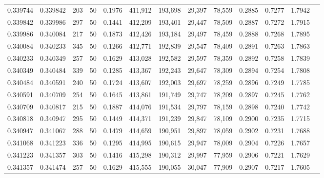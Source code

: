 \begin{tabular}{rrrrrrrrrrrrr}
0.339744 & 0.339842 &   203 &  50 &                                     0.1976 & 411,912 & 193,698 &  29,397 &  78,559 & 0.2885 & 0.7277 & 1.7942 \\
0.339842 & 0.339986 &   297 &  50 &                                     0.1441 & 412,209 & 193,401 &  29,447 &  78,509 & 0.2887 & 0.7272 & 1.7915 \\
0.339986 & 0.340084 &   217 &  50 &                                     0.1873 & 412,426 & 193,184 &  29,497 &  78,459 & 0.2888 & 0.7268 & 1.7895 \\
0.340084 & 0.340233 &   345 &  50 &                                     0.1266 & 412,771 & 192,839 &  29,547 &  78,409 & 0.2891 & 0.7263 & 1.7863 \\
0.340233 & 0.340349 &   257 &  50 &                                     0.1629 & 413,028 & 192,582 &  29,597 &  78,359 & 0.2892 & 0.7258 & 1.7839 \\
0.340349 & 0.340484 &   339 &  50 &                                     0.1285 & 413,367 & 192,243 &  29,647 &  78,309 & 0.2894 & 0.7254 & 1.7808 \\
0.340484 & 0.340591 &   240 &  50 &                                     0.1724 & 413,607 & 192,003 &  29,697 &  78,259 & 0.2896 & 0.7249 & 1.7785 \\
0.340591 & 0.340709 &   254 &  50 &                                     0.1645 & 413,861 & 191,749 &  29,747 &  78,209 & 0.2897 & 0.7245 & 1.7762 \\
0.340709 & 0.340817 &   215 &  50 &                                     0.1887 & 414,076 & 191,534 &  29,797 &  78,159 & 0.2898 & 0.7240 & 1.7742 \\
0.340818 & 0.340947 &   295 &  50 &                                     0.1449 & 414,371 & 191,239 &  29,847 &  78,109 & 0.2900 & 0.7235 & 1.7715 \\
0.340947 & 0.341067 &   288 &  50 &                                     0.1479 & 414,659 & 190,951 &  29,897 &  78,059 & 0.2902 & 0.7231 & 1.7688 \\
0.341068 & 0.341223 &   336 &  50 &                                     0.1295 & 414,995 & 190,615 &  29,947 &  78,009 & 0.2904 & 0.7226 & 1.7657 \\
0.341223 & 0.341357 &   303 &  50 &                                     0.1416 & 415,298 & 190,312 &  29,997 &  77,959 & 0.2906 & 0.7221 & 1.7629 \\
0.341357 & 0.341474 &   257 &  50 &                                     0.1629 & 415,555 & 190,055 &  30,047 &  77,909 & 0.2907 & 0.7217 & 1.7605 \\

\end{tabular}
